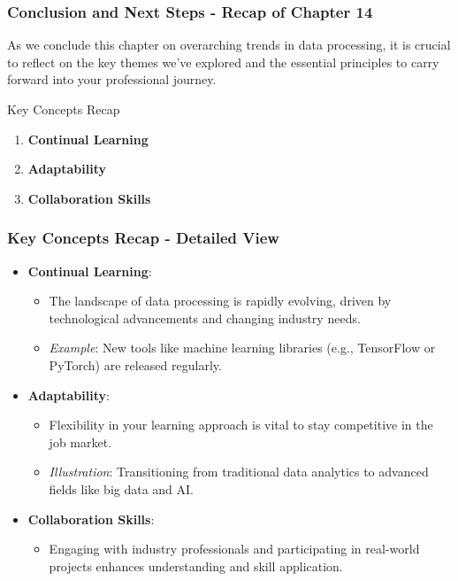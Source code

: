 \documentclass{beamer}
\begin{document}
\begin{frame}[fragile]
    \frametitle{Conclusion and Next Steps - Recap of Chapter 14}
    As we conclude this chapter on overarching trends in data processing, it is crucial to reflect on the key themes we've explored and the essential principles to carry forward into your professional journey.

    \begin{block}{Key Concepts Recap}
        \begin{enumerate}
            \item \textbf{Continual Learning}
            \item \textbf{Adaptability}
            \item \textbf{Collaboration Skills}
        \end{enumerate}
    \end{block}
\end{frame}

\begin{frame}[fragile]
    \frametitle{Key Concepts Recap - Detailed View}
    \begin{itemize}
        \item \textbf{Continual Learning}:
        \begin{itemize}
            \item The landscape of data processing is rapidly evolving, driven by technological advancements and changing industry needs.
            \item \textit{Example}: New tools like machine learning libraries (e.g., TensorFlow or PyTorch) are released regularly.
        \end{itemize}
        
        \item \textbf{Adaptability}:
        \begin{itemize}
            \item Flexibility in your learning approach is vital to stay competitive in the job market.
            \item \textit{Illustration}: Transitioning from traditional data analytics to advanced fields like big data and AI.
        \end{itemize}
        
        \item \textbf{Collaboration Skills}:
        \begin{itemize}
            \item Engaging with industry professionals and participating in real-world projects enhances understanding and skill application.
        \end{itemize}
    \end{itemize}
\end{frame}
\end{document}
